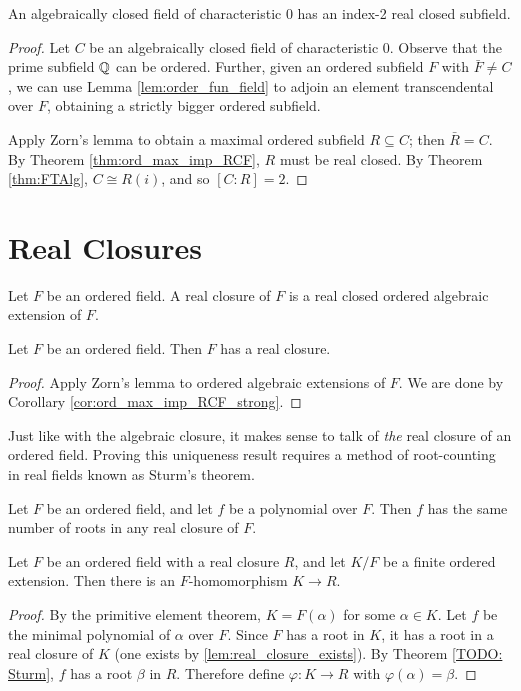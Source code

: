 \begin{lemma}
  An algebraically closed field of characteristic 0 has an index-2 real closed subfield.
\end{lemma}
\begin{proof}
  Let $C$ be an algebraically closed field of characteristic 0. Observe that the prime subfield $\mathbb{Q}$ can be ordered. Further, given an ordered subfield $F$ with $\bar{F}\neq C$, we can use Lemma \ref{lem:order_fun_field} to adjoin an element transcendental over $F$, obtaining a strictly bigger ordered subfield.
  
  Apply Zorn's lemma to obtain a maximal ordered subfield $R\subseteq C$; then $\bar{R}=C$. By Theorem \ref{thm:ord_max_imp_RCF}, $R$ must be real closed. By Theorem \ref{thm:FTAlg}, $C\cong R(i)$, and so $[C:R]=2$.
\end{proof}

\section{Real Closures}

\begin{definition}
  Let $F$ be an ordered field. A real closure of $F$ is a real closed ordered algebraic extension of $F$.
\end{definition}

\begin{lemma}
  \label{lem:real_closure_exists}
  Let $F$ be an ordered field. Then $F$ has a real closure.
\end{lemma}
\begin{proof}
  Apply Zorn's lemma to ordered algebraic extensions of $F$. We are done by Corollary \ref{cor:ord_max_imp_RCF_strong}.
\end{proof}

Just like with the algebraic closure, it makes sense to talk of \textit{the} real closure of an ordered field. Proving this uniqueness result requires a method of root-counting in real fields known as Sturm's theorem.

\begin{theorem}
  \label{TODO: Sturm}
  Let $F$ be an ordered field, and let $f$ be a polynomial over $F$. Then $f$ has the same number of roots in any real closure of $F$.
\end{theorem}

\begin{lemma}
  \label{lem:closure_emb_ext_unordered}
  Let $F$ be an ordered field with a real closure $R$, and let $K/F$ be a finite ordered extension. Then there is an $F$-homomorphism $K\to R$.
\end{lemma}
\begin{proof}
  By the primitive element theorem, $K=F(\alpha)$ for some $\alpha\in K$. Let $f$ be the minimal polynomial of $\alpha$ over $F$. Since $F$ has a root in $K$, it has a root in a real closure of $K$ (one exists by \ref{lem:real_closure_exists}). By Theorem \ref{TODO: Sturm}, $f$ has a root $\beta$ in $R$. Therefore define $\varphi:K\to R$ with $\varphi(\alpha)=\beta$.
\end{proof}

